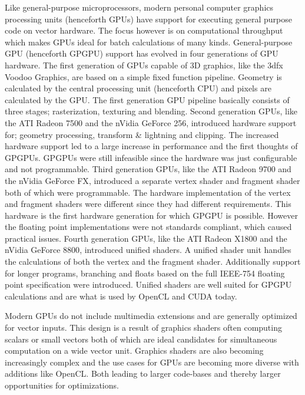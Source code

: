 \documentclass[12pt,a4paper,onecolumn,twoside,openright]{report}
\begin{document}
Like general-purpose microprocessors, modern personal computer graphics processing units (henceforth GPUs) have support for executing general purpose code on vector hardware. The focus however is on computational throughput which makes GPUs ideal for batch calculations of many kinds. General-purpose GPU (henceforth GPGPU) support has evolved in four generations of GPU hardware.
The first generation of GPUs capable of 3D graphics, like the 3dfx Voodoo Graphics, are based on a simple fixed function pipeline. Geometry is calculated by the central processing unit (henceforth CPU) and pixels are calculated by the GPU. The first generation GPU pipeline basically consists of three stages; rasterization, texturing and blending.
Second generation GPUs, like the ATI Radeon 7500\cite{fernando2004programming} and the nVidia GeForce 256\cite{nvidia1999geforce256}, introduced hardware support for; geometry processing, transform \& lightning and clipping. The increased hardware support led to a large increase in performance and the first thoughts of GPGPUs. GPGPUs were still infeasible since the hardware was just configurable and not programmable.
Third generation GPUs, like the ATI Radeon 9700\cite{riguer2006radeon} and the nVidia GeForce FX\cite{riguer2006radeon}, introduced a separate vertex shader and fragment shader both of which were programmable. The hardware implementation of the vertex and fragment shaders were different since they had different requirements. This hardware is the first hardware generation for which GPGPU is possible. However the floating point implementations were not standards compliant, which caused practical issues.
Fourth generation GPUs, like the  ATI Radeon X1800\cite{riguer2006radeon} and the nVidia GeForce 8800\cite{luebke2007gpus}, introduced unified shaders. A unified shader unit handles the calculations of both the vertex and the fragment shader. Additionally support for longer programs, branching and floats based on the full IEEE-754 floating point specification were introduced. Unified shaders are well suited for GPGPU calculations and are what is used by OpenCL and CUDA today.

Modern GPUs do not include multimedia extensions and are generally optimized for vector inputs.
This design is a result of graphics shaders often computing scalars or small vectors both of which are ideal candidates for simultaneous computation on a wide vector unit.
Graphics shaders are also becoming increasingly complex and the use cases for GPUs are becoming more diverse with additions like OpenCL. Both leading to larger code-bases and thereby larger opportunities for optimizations.
\end{document}
